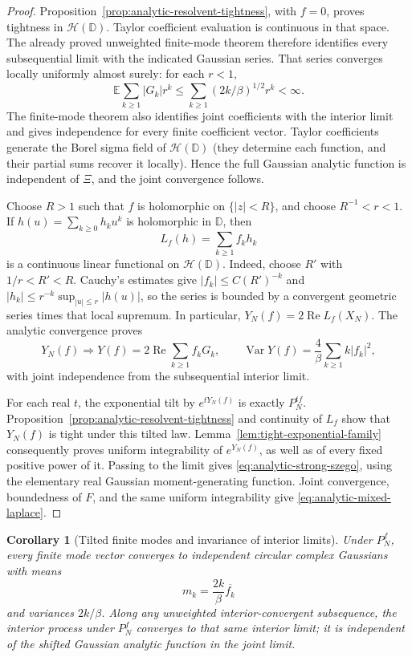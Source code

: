 \documentclass[11pt,a4paper]{article}
\numberwithin{equation}{section}
\newtheorem{corollary}[theorem]{Corollary}
\theoremstyle{definition}
\theoremstyle{remark}
\newcommand{\D}{\mathbb D}
\begin{document}
\begin{proof}
Proposition~\ref{prop:analytic-resolvent-tightness}, with $f=0$, proves
tightness in $\mathcal H(\D)$. Taylor coefficient evaluation is continuous
in that space. The already proved unweighted finite-mode theorem
therefore identifies every subsequential limit with the indicated
Gaussian series. That series converges locally uniformly almost surely:
for each $r<1$,
\[
 \mathbb E\sum_{k\geq1}|G_k|r^k
 \leq\sum_{k\geq1}(2k/\beta)^{1/2}r^k<\infty.
\]
The finite-mode theorem also identifies joint coefficients with the
interior limit and gives independence for every finite coefficient
vector. Taylor coefficients generate the Borel sigma field of
$\mathcal H(\D)$ (they determine each function, and their partial sums
recover it locally). Hence the full Gaussian analytic function is
independent of $\Xi$, and the joint convergence follows.

Choose $R>1$ such that $f$ is holomorphic on $\{|z|<R\}$, and choose
$R^{-1}<r<1$. If $h(u)=\sum_{k\geq0}h_ku^k$ is holomorphic in $\D$,
then
\[
 L_f(h)=\sum_{k\geq1}f_kh_k
\]
is a continuous linear functional on $\mathcal H(\D)$. Indeed, choose
$R'$ with $1/r<R'<R$. Cauchy's estimates give
$|f_k|\leq C(R')^{-k}$ and
$|h_k|\leq r^{-k}\sup_{|u|\leq r}|h(u)|$, so the series is bounded by a
convergent geometric series times that local supremum. In particular,
$Y_N(f)=2\operatorname{Re}L_f(X_N)$. The analytic convergence proves
\[
 Y_N(f)\Rightarrow Y(f)=2\operatorname{Re}\sum_{k\geq1}f_kG_k,
 \qquad
 \operatorname{Var}Y(f)=\frac4\beta\sum_{k\geq1}k|f_k|^2,
\]
with joint independence from the subsequential interior limit.

For each real $t$, the exponential tilt by $e^{tY_N(f)}$ is exactly
$P_N^{tf}$. Proposition~\ref{prop:analytic-resolvent-tightness} and
continuity of $L_f$ show that $Y_N(f)$ is tight under this tilted law.
Lemma~\ref{lem:tight-exponential-family} consequently proves uniform
integrability of $e^{Y_N(f)}$, as well as of every fixed positive power
of it. Passing to the limit gives \eqref{eq:analytic-strong-szego}, using
the elementary real Gaussian moment-generating function. Joint
convergence, boundedness of $F$, and the same uniform integrability give
\eqref{eq:analytic-mixed-laplace}.
\end{proof}

\begin{corollary}[Tilted finite modes and invariance of interior limits]
\label{cor:analytic-tilted-limits}
Under $P_N^f$, every finite mode vector converges to independent circular
complex Gaussians with means
\[
 m_k=\frac{2k}{\beta}\overline{f_k}
\]
and variances $2k/\beta$. Along any unweighted interior-convergent
subsequence, the interior process under $P_N^f$ converges to that same
interior limit; it is independent of the shifted Gaussian analytic
function in the joint limit.
\end{corollary}
\end{document}
